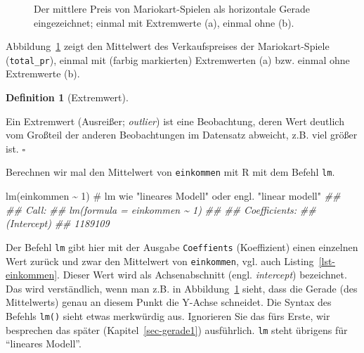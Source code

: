 \documentclass[
  letterpaper,
  twoside,
  open=any]{scrbook}
\newenvironment{Shaded}{\begin{snugshade}}{\end{snugshade}}
\newcommand{\CommentTok}[1]{\textcolor[rgb]{0.37,0.37,0.37}{#1}}
\newcommand{\DecValTok}[1]{\textcolor[rgb]{0.68,0.00,0.00}{#1}}
\newcommand{\DocumentationTok}[1]{\textcolor[rgb]{0.37,0.37,0.37}{\textit{#1}}}
\newcommand{\FunctionTok}[1]{\textcolor[rgb]{0.28,0.35,0.67}{#1}}
\newcommand{\NormalTok}[1]{\textcolor[rgb]{0.00,0.23,0.31}{#1}}
\newcommand{\SpecialCharTok}[1]{\textcolor[rgb]{0.37,0.37,0.37}{#1}}
\theoremstyle{definition}
\newtheorem{definition}{Definition}[chapter]
\theoremstyle{definition}
\theoremstyle{definition}
\theoremstyle{remark}
\begin{document}
\begin{figure}
\begin{minipage}{0.50\linewidth}
{}


\end{minipage}%

\caption{\label{fig-mw2}Der mittlere Preis von Mariokart-Spielen als
horizontale Gerade eingezeichnet; einmal mit Extremwerte (a), einmal
ohne (b).}

\end{figure}%

Abbildung~\ref{fig-mw2} zeigt den Mittelwert des Verkaufspreises der
Mariokart-Spiele (\texttt{total\_pr}), einmal mit (farbig markierten)
Extremwerten (a) bzw. einmal ohne Extremwerte (b).

\begin{definition}[Extremwert]\protect\hypertarget{def-extremwert}{}\label{def-extremwert}

Ein Extremwert (Ausreißer; \emph{outlier}) ist eine Beobachtung, deren
Wert deutlich vom Großteil der anderen Beobachtungen im Datensatz
abweicht, z.B. viel größer ist. \(\square\)

\end{definition}

Berechnen wir mal den Mittelwert von \texttt{einkommen} mit R mit dem
Befehl \texttt{lm}.

\begin{Shaded}
\begin{Highlighting}[]
\FunctionTok{lm}\NormalTok{(einkommen }\SpecialCharTok{\textasciitilde{}} \DecValTok{1}\NormalTok{)  }\CommentTok{\# lm wie "lineares Modell" oder engl. "linear modell"}
\DocumentationTok{\#\# }
\DocumentationTok{\#\# Call:}
\DocumentationTok{\#\# lm(formula = einkommen \textasciitilde{} 1)}
\DocumentationTok{\#\# }
\DocumentationTok{\#\# Coefficients:}
\DocumentationTok{\#\# (Intercept)  }
\DocumentationTok{\#\#     1189109}
\end{Highlighting}
\end{Shaded}

Der Befehl \texttt{lm} gibt hier mit der Ausgabe \texttt{Coeffients}
(Koeffizient) einen einzelnen Wert zurück und zwar den Mittelwert von
\texttt{einkommen}, vgl. auch Listing~\ref{lst-einkommen}. Dieser Wert
wird als Achsenabschnitt (engl. \emph{intercept}) bezeichnet. Das wird
verständlich, wenn man z.B. in Abbildung~\ref{fig-mw2} sieht, dass die
Gerade (des Mittelwerts) genau an diesem Punkt die Y-Achse schneidet.
Die Syntax des Befehls \texttt{lm()} sieht etwas merkwürdig aus.
Ignorieren Sie das fürs Erste, wir besprechen das später
(Kapitel~\ref{sec-gerade1}) ausführlich. \texttt{lm} steht übrigens für
\enquote{lineares Modell}.
\end{document}
